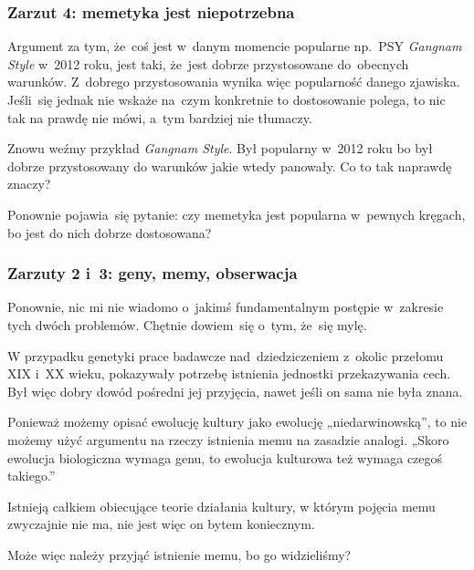 \documentclass[10pt,t]{beamer}
\begin{document}
\begin{frame}
  \frametitle{Zarzut 4: memetyka jest niepotrzebna}


  Argument za tym, że~coś jest w~danym momencie popularne
  np.~PSY \textit{Gangnam Style} w~2012 roku, jest taki, że~jest dobrze
  przystosowane do~obecnych warunków. Z~dobrego przystosowania wynika więc
  popularność danego zjawiska. Jeśli~się jednak nie wskaże na~czym
  konkretnie to dostosowanie polega, to nic tak na prawdę nie mówi, a~tym
  bardziej nie tłumaczy.

  Znowu weźmy przykład \textit{Gangnam Style}. Był popularny w~2012 roku bo
  był dobrze przystosowany do warunków jakie wtedy panowały. Co to tak
  naprawdę znaczy?

  Ponownie pojawia~się pytanie: czy memetyka jest popularna
  w~pewnych kręgach, bo jest do nich dobrze dostosowana?

\end{frame}





\begin{frame}
  \frametitle{Zarzuty 2 i~3: geny, memy, obserwacja}


  Ponownie, nic mi nie wiadomo o~jakimś fundamentalnym postępie
  w~zakresie tych dwóch problemów. Chętnie dowiem~się o~tym, że~się mylę.

  W przypadku genetyki prace badawcze nad~dziedziczeniem z~okolic przełomu
  XIX i~XX wieku, pokazywały potrzebę istnienia jednostki przekazywania
  cech. Był więc dobry dowód pośredni jej przyjęcia, nawet jeśli on sama
  nie była znana.

  Ponieważ możemy opisać ewolucję kultury jako ewolucję „niedarwinowską”,
  to nie możemy użyć argumentu na rzeczy istnienia memu na zasadzie
  analogi. „Skoro ewolucja biologiczna wymaga genu, to ewolucja kulturowa
  też wymaga czegoś takiego.”

  Istnieją całkiem obiecujące teorie działania kultury, w którym pojęcia
  memu zwyczajnie nie ma, nie jest więc on bytem koniecznym.

  Może więc należy przyjąć istnienie memu, bo go widzieliśmy?

\end{frame}
\end{document}
